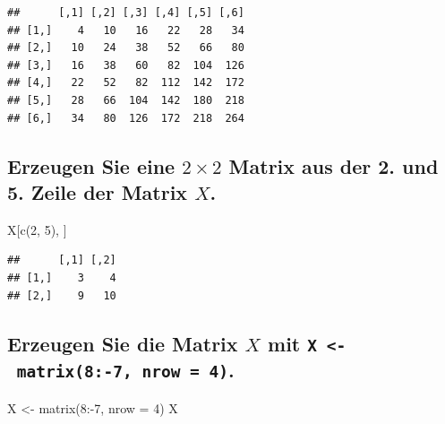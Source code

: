 \documentclass[12pt,a4paper]{article}
\newenvironment{Shaded}{\begin{snugshade}}{\end{snugshade}}
\newcommand{\AttributeTok}[1]{\textcolor[rgb]{0.77,0.63,0.00}{#1}}
\newcommand{\DecValTok}[1]{\textcolor[rgb]{0.00,0.00,0.81}{#1}}
\newcommand{\FunctionTok}[1]{\textcolor[rgb]{0.00,0.00,0.00}{#1}}
\newcommand{\NormalTok}[1]{#1}
\newcommand{\OtherTok}[1]{\textcolor[rgb]{0.56,0.35,0.01}{#1}}
\newcommand{\SpecialCharTok}[1]{\textcolor[rgb]{0.00,0.00,0.00}{#1}}
\begin{document}
\begin{verbatim}
##      [,1] [,2] [,3] [,4] [,5] [,6]
## [1,]    4   10   16   22   28   34
## [2,]   10   24   38   52   66   80
## [3,]   16   38   60   82  104  126
## [4,]   22   52   82  112  142  172
## [5,]   28   66  104  142  180  218
## [6,]   34   80  126  172  218  264
\end{verbatim}

\vspace{0.5cm}

\hypertarget{erzeugen-sie-eine-2-times-2-matrix-aus-der-2.-und-5.-zeile-der-matrix-x.}{%
\subsection{\texorpdfstring{Erzeugen Sie eine \(2 \times 2\) Matrix aus
der 2. und 5. Zeile der Matrix
\(X\).}{Erzeugen Sie eine 2 \textbackslash times 2 Matrix aus der 2. und 5. Zeile der Matrix X.}}\label{erzeugen-sie-eine-2-times-2-matrix-aus-der-2.-und-5.-zeile-der-matrix-x.}}

\begin{Shaded}
\begin{Highlighting}[]
\NormalTok{    X[}\FunctionTok{c}\NormalTok{(}\DecValTok{2}\NormalTok{, }\DecValTok{5}\NormalTok{), ]}
\end{Highlighting}
\end{Shaded}

\begin{verbatim}
##      [,1] [,2]
## [1,]    3    4
## [2,]    9   10
\end{verbatim}

\vspace{0.5cm}

\hypertarget{erzeugen-sie-die-matrix-x-mit-x---matrix8-7-nrow-4.}{%
\subsection{\texorpdfstring{Erzeugen Sie die Matrix \(X\) mit
\texttt{X\ \textless{}-\ matrix(8:-7,\ nrow\ =\ 4)}.}{Erzeugen Sie die Matrix X mit X \textless- matrix(8:-7, nrow = 4).}}\label{erzeugen-sie-die-matrix-x-mit-x---matrix8-7-nrow-4.}}

\begin{Shaded}
\begin{Highlighting}[]
\NormalTok{    X }\OtherTok{\textless{}{-}} \FunctionTok{matrix}\NormalTok{(}\DecValTok{8}\SpecialCharTok{:{-}}\DecValTok{7}\NormalTok{, }\AttributeTok{nrow =} \DecValTok{4}\NormalTok{)}
\NormalTok{    X}
\end{Highlighting}
\end{Shaded}
\end{document}
